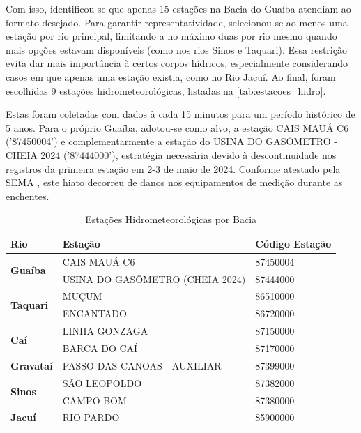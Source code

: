 Com isso, identificou-se que apenas 15 estações na Bacia do Guaíba atendiam ao formato desejado. Para garantir
representatividade, selecionou-se ao menos uma estação por rio principal, limitando a no máximo duas por rio mesmo
quando mais opções estavam disponíveis (como nos rios Sinos e Taquari). Essa restrição evita dar mais importância à
certos corpos hídricos, especialmente considerando casos em que apenas uma estação existia, como no Rio Jacuí. Ao final,
foram escolhidas 9 estações hidrometeorológicas, listadas na \autoref{tab:estacoes_hidro}.

Estas foram coletadas com dados à cada 15 minutos para um período histórico de 5 anos. Para o próprio Guaíba, adotou-se
como alvo, a estação CAIS MAUÁ C6 ('87450004') e complementarmente a estação do USINA DO GASÔMETRO - CHEIA 2024
('87444000'), estratégia necessária devido à descontinuidade nos registros da primeira estação em 2-3 de maio de 2024.
Conforme atestado pela SEMA \cite{informativo_sema}, este hiato decorreu de danos nos equipamentos de medição durante as
enchentes.

\begin{table}[h!]
    \centering
    \caption{Estações Hidrometeorológicas por Bacia}
    \label{tab:estacoes_hidro}
    \begin{tabular}{|l|l|l|}
        \hline
        \textbf{Rio} & \textbf{Estação} & \textbf{Código Estação} \\
        \hline
        \hline
        \multirow{2}{*}{\textbf{Guaíba}} & CAIS MAUÁ C6 & 87450004 \\
        \cline{2-3}
        & USINA DO GASÔMETRO (CHEIA 2024) & 87444000 \\
        \hline
        \multirow{2}{*}{\textbf{Taquari}} & MUÇUM & 86510000 \\
        \cline{2-3}
        & ENCANTADO & 86720000 \\
        \hline
        \multirow{2}{*}{\textbf{Caí}} & LINHA GONZAGA & 87150000 \\
        \cline{2-3}
        & BARCA DO CAÍ & 87170000 \\
        \hline
        \textbf{Gravataí} & PASSO DAS CANOAS - AUXILIAR & 87399000 \\
        \hline
        \multirow{2}{*}{\textbf{Sinos}} & SÃO LEOPOLDO & 87382000 \\
        \cline{2-3}
        & CAMPO BOM & 87380000 \\
        \hline
        \textbf{Jacuí} & RIO PARDO & 85900000 \\
        \hline
    \end{tabular}
\end{table}

